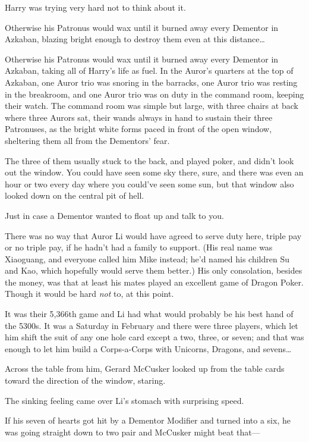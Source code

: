 Harry was trying very hard not to think about it.

Otherwise his Patronus would wax until it burned away every Dementor in 
Azkaban, blazing bright enough to destroy them even at this distance{\ldots}

Otherwise his Patronus would wax until it burned away every Dementor in 
Azkaban, taking all of Harry's life as fuel.
\sbreak
In the Auror's quarters at the top of Azkaban, one Auror trio was snoring in 
the barracks, one Auror trio was resting in the breakroom, and one Auror trio 
was on duty in the command room, keeping their watch. The command room was 
simple but large, with three chairs at back where three Aurors sat, their wands 
always in hand to sustain their three Patronuses, as the bright white forms 
paced in front of the open window, sheltering them all from the Dementors' fear.

The three of them usually stuck to the back, and played poker, and didn't look 
out the window. You could have seen some sky there, sure, and there was even an 
hour or two every day where you could've seen some sun, but that window also 
looked down on the central pit of hell.

Just in case a Dementor wanted to float up and talk to you.

There was no way that Auror Li would have agreed to serve duty here, triple pay 
or no triple pay, if he hadn't had a family to support. (His real name was 
Xiaoguang, and everyone called him Mike instead; he'd named his children Su and 
Kao, which hopefully would serve them better.) His only consolation, besides 
the money, was that at least his mates played an excellent game of Dragon 
Poker. Though it would be hard \emph{not} to, at this point.

It was their 5,366th game and Li had what would probably be his best hand of 
the 5300s. It was a Saturday in February and there were three players, which 
let him shift the suit of any one hole card except a two, three, or seven; and 
that was enough to let him build a Corps-a-Corps with Unicorns, Dragons, and 
sevens{\ldots}

Across the table from him, Gerard McCusker looked up from the table cards 
toward the direction of the window, staring.

The sinking feeling came over Li's stomach with surprising speed.

If his seven of hearts got hit by a Dementor Modifier and turned into a six, he 
was going straight down to two pair and McCusker might beat that---

